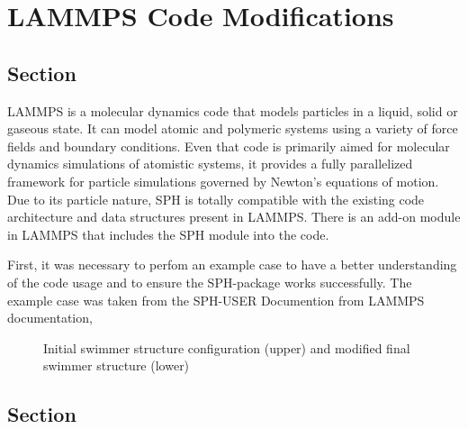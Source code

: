 
\chapter{LAMMPS Code Modifications}
\label{chap:chapter_3}

\section{Section}
\label{sec:section_1}

LAMMPS is a molecular dynamics code that models particles in a liquid, solid or gaseous state\cite{lammps_manual}. It can model atomic and polymeric systems using a variety of force fields and
boundary conditions. Even that code is primarily aimed for molecular dynamics simulations of atomistic systems, it provides a fully parallelized framework for particle simulations
governed by Newton's equations of motion. Due to its particle nature, SPH is totally compatible with the existing code architecture and data structures present in LAMMPS. There is 
an add-on module in LAMMPS that includes the SPH module into the code.\par
First, it was necessary to perfom an example case to have a better understanding of the code usage and to ensure the SPH-package works successfully. The example case was taken from 
the SPH-USER Documention from LAMMPS documentation\cite{ganzenmuller_implementation_2011},


\begin{figure}[ht]
\centering
  \begin{footnotesize}
  
  \caption[Initial swimmer structure configuration (upper) and modified final swimmer structure (lower)]{Initial swimmer structure configuration (upper) and modified final swimmer structure (lower)}
  \label{fig:Bild3}
  \end{footnotesize}
\end{figure} 





\section{Section}
\label{sec:section 2}


